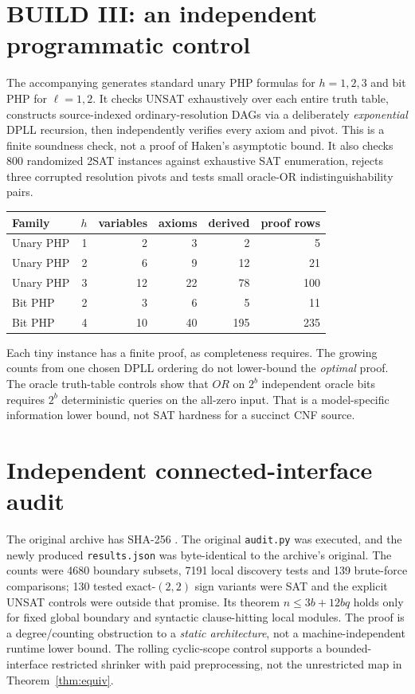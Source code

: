 \documentclass[11pt]{article}
\begin{document}
\section{BUILD III: an independent programmatic control}
The accompanying  generates standard unary PHP formulas for $h=1,2,3$ and bit PHP for $\ell=1,2$. It checks UNSAT exhaustively over each entire truth table, constructs source-indexed ordinary-resolution DAGs via a deliberately \emph{exponential} DPLL recursion, then independently verifies every axiom and pivot. This is a finite soundness check, not a proof of Haken's asymptotic bound. It also checks 800 randomized 2SAT instances against exhaustive SAT enumeration, rejects three corrupted resolution pivots and tests small oracle-OR indistinguishability pairs.
\begin{center}\begin{tabular}{lrrrrr}\toprule
Family & $h$ & variables & axioms & derived & proof rows\\\midrule
Unary PHP & 1 & 2 & 3 & 2 & 5\\
Unary PHP & 2 & 6 & 9 & 12 & 21\\
Unary PHP & 3 & 12 & 22 & 78 & 100\\
Bit PHP & 2 & 3 & 6 & 5 & 11\\
Bit PHP & 4 & 10 & 40 & 195 & 235\\\bottomrule
\end{tabular}\end{center}
Each tiny instance has a finite proof, as completeness requires. The growing counts from one chosen DPLL ordering do not lower-bound the \emph{optimal} proof. The oracle truth-table controls show that $OR$ on $2^b$ independent oracle bits requires $2^b$ deterministic queries on the all-zero input. That is a model-specific information lower bound, not SAT hardness for a succinct CNF source.

\section{Independent connected-interface audit}
The original archive has SHA-256 \texttt{}. The original \texttt{audit.py} was executed, and the newly produced \texttt{results.json} was byte-identical to the archive's original. The counts were 4680 boundary subsets, 7191 local discovery tests and 139 brute-force comparisons; 130 tested exact-$(2,2)$ sign variants were SAT and the explicit UNSAT controls were outside that promise. Its theorem $n\le 3b+12bq$ holds only for fixed global boundary and syntactic clause-hitting local modules. The proof is a degree/counting obstruction to a \emph{static architecture}, not a machine-independent runtime lower bound. The rolling cyclic-scope control supports a bounded-interface restricted shrinker with paid preprocessing, not the unrestricted map in Theorem~\ref{thm:equiv}.
\end{document}
